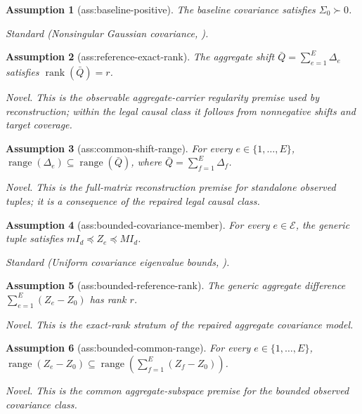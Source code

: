\documentclass{article}
\newtheorem{assumption}{Assumption}
\begin{document}
\begin{assumption}[ass:baseline-positive]\label{ass:baseline-positive}
The baseline covariance satisfies \(\Sigma_0\succ0\).
\par\smallskip\noindent\emph{Standard} (Nonsingular Gaussian covariance, \cite{StriederFreidlingHaffnerDrton2021ConfidenceCausalDiscovery}).
\end{assumption}

\begin{assumption}[ass:reference-exact-rank]\label{ass:reference-exact-rank}
The aggregate shift \(\bar Q=\sum_{e=1}^E\Delta_e\) satisfies \(\operatorname{rank}(\bar Q)=r\).
\par\smallskip\noindent\emph{Novel.} This is the observable aggregate-carrier regularity premise used by reconstruction; within the legal causal class it follows from nonnegative shifts and target coverage.
\end{assumption}

\begin{assumption}[ass:common-shift-range]\label{ass:common-shift-range}
For every \(e\in\{1,\ldots,E\}\), \(\operatorname{range}(\Delta_e)\subseteq\operatorname{range}(\bar Q)\), where \(\bar Q=\sum_{f=1}^E\Delta_f\).
\par\smallskip\noindent\emph{Novel.} This is the full-matrix reconstruction premise for standalone observed tuples; it is a consequence of the repaired legal causal class.
\end{assumption}

\begin{assumption}[ass:bounded-covariance-member]\label{ass:bounded-covariance-member}
For every \(e\in\mathcal E\), the generic tuple satisfies \(mI_d\preceq Z_e\preceq MI_d\).
\par\smallskip\noindent\emph{Standard} (Uniform covariance eigenvalue bounds, \cite{Lewis2022RobustHeteroskedasticity}).
\end{assumption}

\begin{assumption}[ass:bounded-reference-rank]\label{ass:bounded-reference-rank}
The generic aggregate difference \(\sum_{e=1}^E(Z_e-Z_0)\) has rank \(r\).
\par\smallskip\noindent\emph{Novel.} This is the exact-rank stratum of the repaired aggregate covariance model.
\end{assumption}

\begin{assumption}[ass:bounded-common-range]\label{ass:bounded-common-range}
For every \(e\in\{1,\ldots,E\}\), \(\operatorname{range}(Z_e-Z_0)\subseteq\operatorname{range}(\sum_{f=1}^E(Z_f-Z_0))\).
\par\smallskip\noindent\emph{Novel.} This is the common aggregate-subspace premise for the bounded observed covariance class.
\end{assumption}
\end{document}
